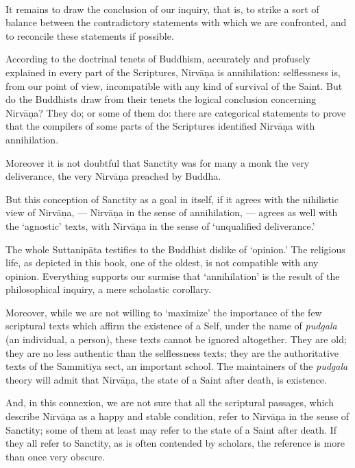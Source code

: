 \documentclass[a4paper, 11pt, oneside, english]{article}
\begin{document}
\paragraph{}
It remains to draw the conclusion of our inquiry, that is, to strike a sort of balance between the contradictory statements with which we are confronted, and to reconcile these statements if possible.

According to the doctrinal tenets of Buddhism, accurately and profusely explained in every part of the Scriptures, Nirvāṇa is annihilation: selflessness is, from our point of view, incompatible with any kind of survival of the Saint. But do the Buddhists draw from their tenets the logical conclusion concerning Nirvāṇa? They do; or some of them do: there are categorical statements to prove that the compilers of some parts of the Scriptures identified Nirvāṇa with annihilation.

Moreover it is not doubtful that Sanctity was for many a monk the very deliverance, the very Nirvāṇa preached by Buddha.

But this conception of Sanctity as a goal in itself, if it agrees with the nihilistic view of Nirvāṇa, --- Nirvāṇa in the sense of annihilation, --- agrees as well with the `agnostic' texts, with Nirvāṇa in the sense of `unqualified deliverance.'

The whole Suttanipāta testifies to the Buddhist dislike of `opinion.' The religious life, as depicted in this book, one of the oldest, is not compatible with any opinion. Everything supports our surmise that `annihilation' is the result of the philosophical inquiry, a mere scholastic corollary.

Moreover, while we are not willing to `maximize' the importance of the few scriptural texts which affirm the existence of a Self, under the name of \emph{pudgala} (an individual, a person), these texts cannot be ignored altogether. They are old; they are no less authentic than the selflessness texts; they are the authoritative texts of the Sammitīya sect, an important school. The maintainers of the \emph{pudgala} theory will admit that Nirvāṇa, the state of a Saint after death, is existence.

And, in this connexion, we are not sure that all the scriptural passages, which describe Nirvāṇa as a happy and stable condition, refer to Nirvāṇa in the sense of Sanctity; some of them at least may refer to the state of a Saint after death. If they all refer to Sanctity, as is often contended by scholars, the reference is more than once very obscure.
\end{document}
